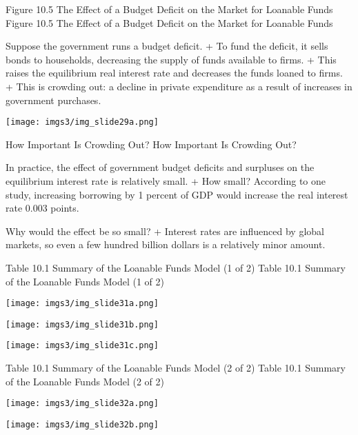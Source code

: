 \documentclass[
  12pt,
  ignorenonframetext,
]{beamer}
\begin{document}
\begin{frame}{Figure 10.5 The Effect of a Budget Deficit on the Market
for Loanable Funds}
\protect\hypertarget{figure-10.5-the-effect-of-a-budget-deficit-on-the-market-for-loanable-funds}{}
Figure 10.5 The Effect of a Budget Deficit on the Market for Loanable
Funds

Suppose the government runs a budget deficit. + To fund the deficit, it
sells bonds to households, decreasing the supply of funds available to
firms. + This raises the equilibrium real interest rate and decreases
the funds loaned to firms. + This is crowding out: a decline in private
expenditure as a result of increases in government purchases.

\texttt{[image: imgs3/img\_slide29a.png]}
\end{frame}

\begin{frame}{How Important Is Crowding Out?}
\protect\hypertarget{how-important-is-crowding-out}{}
How Important Is Crowding Out?

In practice, the effect of government budget deficits and surpluses on
the equilibrium interest rate is relatively small. + How small?
According to one study, increasing borrowing by 1 percent of GDP would
increase the real interest rate 0.003 points.

Why would the effect be so small? + Interest rates are influenced by
global markets, so even a few hundred billion dollars is a relatively
minor amount.
\end{frame}

\begin{frame}{Table 10.1 Summary of the Loanable Funds Model (1 of 2)}
\protect\hypertarget{table-10.1-summary-of-the-loanable-funds-model-1-of-2}{}
Table 10.1 Summary of the Loanable Funds Model (1 of 2)

\texttt{[image: imgs3/img\_slide31a.png]}

\texttt{[image: imgs3/img\_slide31b.png]}

\texttt{[image: imgs3/img\_slide31c.png]}
\end{frame}

\begin{frame}{Table 10.1 Summary of the Loanable Funds Model (2 of 2)}
\protect\hypertarget{table-10.1-summary-of-the-loanable-funds-model-2-of-2}{}
Table 10.1 Summary of the Loanable Funds Model (2 of 2)

\texttt{[image: imgs3/img\_slide32a.png]}

\texttt{[image: imgs3/img\_slide32b.png]}
\end{frame}
\end{document}
